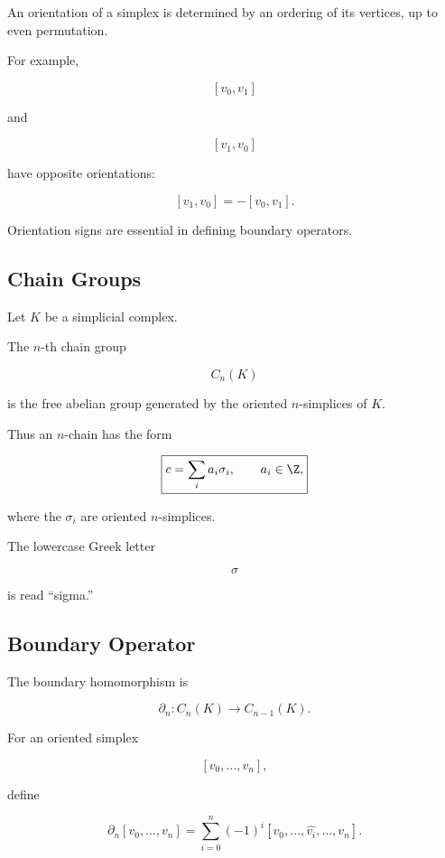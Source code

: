 An orientation of a simplex is determined by an ordering of its vertices,
up to even permutation.

For example,

\[
[v_0,v_1]
\]

and

\[
[v_1,v_0]
\]

have opposite orientations:

\[
\boxed{
[v_1,v_0]
=
-[v_0,v_1].
}
\]

Orientation signs are essential in defining boundary operators.

\subsection{Chain Groups}
\label{subsec:chain-groups}

Let \(K\) be a simplicial complex.

The \(n\)-th chain group

\[
\boxed{
C_n(K)
}
\]

is the free abelian group generated by the oriented \(n\)-simplices of
\(K\).

Thus an \(n\)-chain has the form

\[
\boxed{
c
=
\sum_i a_i\sigma_i,
\qquad
a_i\in\Z,
}
\]

where the \(\sigma_i\) are oriented \(n\)-simplices.

The lowercase Greek letter

\[
\sigma
\]

is read ``sigma.''

\subsection{Boundary Operator}
\label{subsec:boundary-operator}

The boundary homomorphism is

\[
\boxed{
\partial_n:
C_n(K)\to C_{n-1}(K).
}
\]

For an oriented simplex

\[
[v_0,\ldots,v_n],
\]

define

\[
\boxed{
\partial_n[v_0,\ldots,v_n]
=
\sum_{i=0}^{n}
(-1)^i
[v_0,\ldots,\widehat{v_i},\ldots,v_n].
}
\]

